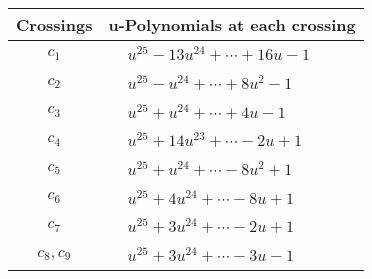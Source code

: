 \documentclass[1p]{elsarticle_modified}
\theoremstyle{definition}
\begin{document}
\begin{tabular}{m{50pt}|m{274pt}}
Crossings & \hspace{64pt}u-Polynomials at each crossing \\
\hline $$\begin{aligned}c_{1}\end{aligned}$$&$\begin{aligned}
&u^{25}-13 u^{24}+\cdots+16 u-1
\end{aligned}$\\
\hline $$\begin{aligned}c_{2}\end{aligned}$$&$\begin{aligned}
&u^{25}- u^{24}+\cdots+8 u^2-1
\end{aligned}$\\
\hline $$\begin{aligned}c_{3}\end{aligned}$$&$\begin{aligned}
&u^{25}+u^{24}+\cdots+4 u-1
\end{aligned}$\\
\hline $$\begin{aligned}c_{4}\end{aligned}$$&$\begin{aligned}
&u^{25}+14 u^{23}+\cdots-2 u+1
\end{aligned}$\\
\hline $$\begin{aligned}c_{5}\end{aligned}$$&$\begin{aligned}
&u^{25}+u^{24}+\cdots-8 u^2+1
\end{aligned}$\\
\hline $$\begin{aligned}c_{6}\end{aligned}$$&$\begin{aligned}
&u^{25}+4 u^{24}+\cdots-8 u+1
\end{aligned}$\\
\hline $$\begin{aligned}c_{7}\end{aligned}$$&$\begin{aligned}
&u^{25}+3 u^{24}+\cdots-2 u+1
\end{aligned}$\\
\hline $$\begin{aligned}c_{8},c_{9}\end{aligned}$$&$\begin{aligned}
&u^{25}+3 u^{24}+\cdots-3 u-1
\end{aligned}$\\

\end{tabular}
\end{document}

